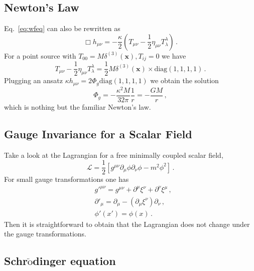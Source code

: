 \documentclass[12pt]{article}
\newcommand{\be}{\begin{equation}}
\newcommand{\ee}{\end{equation}}
\newcommand\m{\mu}
\newcommand\n{\nu}
\renewcommand\a{\alpha}
\renewcommand\b{\beta}
\renewcommand\l{\lambda}
\def\d{\partial}
\begin{document}


\subsection{Newton's Law}

Eq.~\eqref{eq:wfeq} can also be rewritten as
\be
\Box h_{\m\n}=-\frac{\kappa}{2}(T_{\m\n}-\frac{1}{2}\eta_{\m\n}T^\l_\l)\,.
\ee
For a point source with $T_{00}=M \delta^{(3)}(\textbf{x}), T_{ij}=0$ we have
\be
T_{\m\n}-\frac{1}{2} \eta_{\m\n}T^\l_\l=\frac{1}{2}M \delta^{(3)}(\textbf{x})\times \text{diag}(1,1,1,1)\,.
\ee
Plugging an ansatz $\kappa h_{\m\n}=2 \Phi_g\text{diag}(1,1,1,1)$ we obtain the solution
\be
\Phi_g=-\frac{\kappa^2 M}{32 \pi}\frac{1}{r}=-\frac{G M}{r}\,,
\ee
which is nothing but the familiar Newton's law.

\subsection{Gauge Invariance for a Scalar Field}

Take a look at the Lagrangian for a free minimally coupled scalar field,
\be
\mathcal{L}=\frac{1}{2}\left[g^{\m\n}\d_\m\phi\d_\n\phi-m^2\phi^2\right]\,.
\ee
For small gauge transformations one has
\be
\begin{split}
& g'^{\mu \nu}= g^{\mu \nu}+\d^\m \xi^\n+\d^\n \xi^\m\,,\\
& \d'_{\mu}= \d_{\mu}-(\d_\m\xi^\n) \d_\n\,,\\
& \phi'(x')=\phi(x)\,.
\end{split}
\ee
Then it is straightforward to obtain that the Lagrangian does not change under  the gauge
transformations.

\subsection{Schr$\ddot{\text{o}}$dinger equation}
\end{document}
